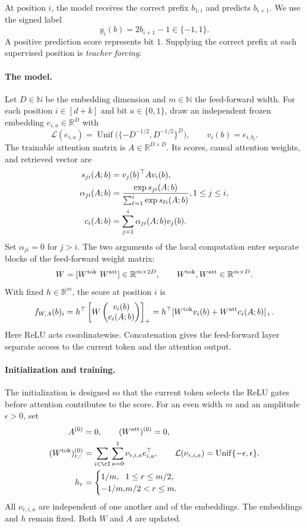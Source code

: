 \documentclass[11pt,twoside]{article}
\newcommand{\Law}{\mathcal L}
\newcommand{\R}{\mathbb R}
\theoremstyle{definition}
\theoremstyle{remark}
\begin{document}
At position $i$, the model receives the correct prefix $b_{1:i}$ and
predicts $b_{i+1}$. We use the signed label
\[
y_i(b)=2b_{i+1}-1\in\{-1,1\}.
\]
A positive prediction score represents bit $1$. Supplying the correct prefix
at each supervised position is \emph{teacher forcing}.

\paragraph{The model.}
Let $D\in\mathbb N$ be the embedding dimension and $m\in\mathbb N$ the
feed-forward width. For each position $i\in[d+k]$ and bit $a\in\{0,1\}$,
draw an independent
frozen embedding $e_{i,a}\in\R^D$ with
\[
\Law(e_{i,a})=\operatorname{Unif}
\bigl(\{-D^{-1/2},D^{-1/2}\}^D\bigr),
\qquad v_i(b)=e_{i,b_i}.
\]
The trainable attention matrix is $A\in\R^{D\times D}$. Its scores, causal
attention weights, and retrieved vector are
\begin{align}
s_{ji}(A;b)&=v_j(b)^\top A v_i(b),\notag\\
\alpha_{ji}(A;b)
&=\frac{\exp s_{ji}(A;b)}{\sum_{\ell=1}^i\exp s_{\ell i}(A;b)},
\quad 1\le j\le i,\notag\\
c_i(A;b)&=\sum_{j=1}^i\alpha_{ji}(A;b)v_j(b).
\label{eq:transformer-attention}
\end{align}
Set $\alpha_{ji}=0$ for $j>i$. The two arguments of the local computation
enter separate blocks of the feed-forward weight matrix:
\[
W=[W^{\rm tok}\ W^{\rm att}]\in\R^{m\times2D},
\qquad W^{\rm tok},W^{\rm att}\in\R^{m\times D}.
\]
With fixed $h\in\R^m$, the score at position $i$ is
\begin{equation}
f_{W,A}(b)_i
=h^\top\left[W
\begin{pmatrix}v_i(b)\\c_i(A;b)\end{pmatrix}\right]_+
=h^\top[W^{\rm tok}v_i(b)+W^{\rm att}c_i(A;b)]_+.
\label{eq:transformer-score}
\end{equation}
Here ReLU acts coordinatewise. Concatenation gives the feed-forward layer
separate access to the current token and the attention output.

\paragraph{Initialization and training.}
The initialization is designed so that the current token selects the ReLU
gates before attention contributes to the score. For an even width $m$ and
an amplitude $\epsilon>0$, set
\begin{align}
A^{(0)}&=0,\qquad (W^{\rm att})^{(0)}=0,\notag\\
(W^{\rm tok})^{(0)}_{r,:}
&=\sum_{i\in\cI}\sum_{a=0}^1\nu_{r,i,a}e_{i,a}^\top,\qquad
\Law(\nu_{r,i,a})=\operatorname{Unif}\{-\epsilon,\epsilon\},\notag\\
h_r&=
\begin{cases}
1/m,&1\le r\le m/2,\\
-1/m,&m/2<r\le m.
\end{cases}
\label{eq:transformer-initialization}
\end{align}
All $\nu_{r,i,a}$ are independent of one another and of the embeddings.
The embeddings and $h$ remain fixed. Both $W$ and $A$ are updated.
\end{document}
